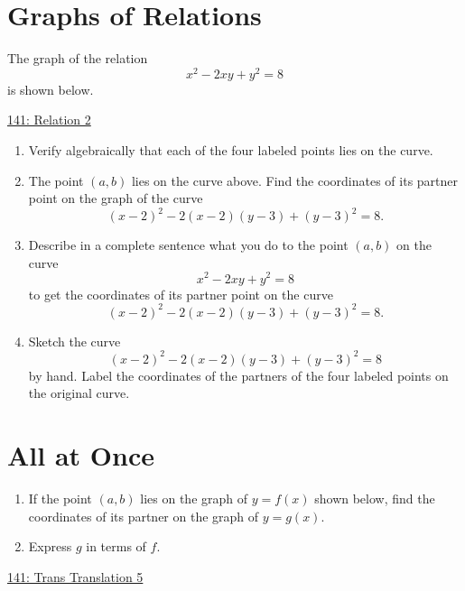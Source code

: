 \documentclass{ximera}
\begin{document}
\section{Graphs of Relations}

The graph of the relation 
\[
   x^2 - 2xy + y^2 = 8
\]
is shown below.

\begin{question} \label{Qpdr3f3tr}
\begin{onlineOnly}
    \begin{center}
\end{center}
\end{onlineOnly}

\href{https://www.desmos.com/calculator/y3rcjw6ujj}{141: Relation 2}

\begin{enumerate}
\item Verify algebraically that each of the four labeled points lies on the curve.

\item The point $(a,b)$ lies on the curve above. Find the coordinates of its partner point on the graph of the curve
\[
    (x-2)^2 - 2(x-2)(y-3) + (y-3)^2 = 8.
\]

\item Describe in a complete sentence what you do to the point $(a,b)$ on the curve
\[
   x^2 - 2xy + y^2 = 8
\]
to get the coordinates of its partner point on the curve
\[
    (x-2)^2 - 2(x-2)(y-3) + (y-3)^2 = 8.
\]

\item Sketch the curve
\[
    (x-2)^2 - 2(x-2)(y-3) + (y-3)^2 = 8
\]
by hand. Label the coordinates of the partners of the four labeled points on the original curve.
\end{enumerate}

\end{question}

\section{All at Once}

\begin{question} \label{Qpddder3f3tr}

\begin{enumerate}
\item If the point $(a,b)$ lies on the graph of $y=f(x)$ shown below, find the coordinates of its partner on the graph of $y=g(x)$.

\item Express $g$ in terms of $f$. 
\end{enumerate}

\begin{onlineOnly}
    \begin{center}
\end{center}
\end{onlineOnly}

\href{https://www.desmos.com/calculatorhaa3sdgkb3}{141: Trans Translation 5}

\end{question}
\end{document}
